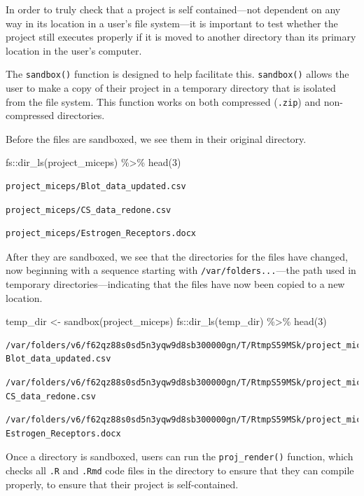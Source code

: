 \documentclass[12pt,twoside]{reedthesis}
\newenvironment{Shaded}{\begin{snugshade}}{\end{snugshade}}
\newcommand{\DecValTok}[1]{\textcolor[rgb]{0.00,0.00,0.81}{#1}}
\newcommand{\FunctionTok}[1]{\textcolor[rgb]{0.00,0.00,0.00}{#1}}
\newcommand{\NormalTok}[1]{#1}
\newcommand{\OtherTok}[1]{\textcolor[rgb]{0.56,0.35,0.01}{#1}}
\newcommand{\SpecialCharTok}[1]{\textcolor[rgb]{0.00,0.00,0.00}{#1}}
\newcommand{\StringTok}[1]{\textcolor[rgb]{0.31,0.60,0.02}{#1}}
\begin{document}
In order to truly check that a project is self contained---not dependent on any way in its location in a user's file system---it is important to test whether the project still executes properly if it is moved to another directory than its primary location in the user's computer.

The \texttt{sandbox()} function is designed to help facilitate this. \texttt{sandbox()} allows the user to make a copy of their project in a temporary directory that is isolated from the file system. This function works on both compressed (\texttt{.zip}) and non-compressed directories.

Before the files are sandboxed, we see them in their original directory.
\begin{Shaded}
\begin{Highlighting}[]
\NormalTok{fs}\SpecialCharTok{::}\FunctionTok{dir\_ls}\NormalTok{(}\StringTok{\textquotesingle{}project\_miceps\textquotesingle{}}\NormalTok{) }\SpecialCharTok{\%\textgreater{}\%}
  \FunctionTok{head}\NormalTok{(}\DecValTok{3}\NormalTok{)}
\end{Highlighting}
\end{Shaded}
\begin{verbatim}
project_miceps/Blot_data_updated.csv 
\end{verbatim}
\begin{verbatim}
project_miceps/CS_data_redone.csv 
\end{verbatim}
\begin{verbatim}
project_miceps/Estrogen_Receptors.docx
\end{verbatim}
After they are sandboxed, we see that the directories for the files have changed, now beginning with a sequence starting with \texttt{/var/folders...}---the path used in temporary directories---indicating that the files have now been copied to a new location.
\begin{Shaded}
\begin{Highlighting}[]
\NormalTok{temp\_dir }\OtherTok{\textless{}{-}} \FunctionTok{sandbox}\NormalTok{(}\StringTok{\textquotesingle{}project\_miceps\textquotesingle{}}\NormalTok{)}
\NormalTok{fs}\SpecialCharTok{::}\FunctionTok{dir\_ls}\NormalTok{(temp\_dir) }\SpecialCharTok{\%\textgreater{}\%} 
  \FunctionTok{head}\NormalTok{(}\DecValTok{3}\NormalTok{)}
\end{Highlighting}
\end{Shaded}
\begin{verbatim}
/var/folders/v6/f62qz88s0sd5n3yqw9d8sb300000gn/T/RtmpS59MSk/project_miceps/
Blot_data_updated.csv 
\end{verbatim}
\begin{verbatim}
/var/folders/v6/f62qz88s0sd5n3yqw9d8sb300000gn/T/RtmpS59MSk/project_miceps/
CS_data_redone.csv 
\end{verbatim}
\begin{verbatim}
/var/folders/v6/f62qz88s0sd5n3yqw9d8sb300000gn/T/RtmpS59MSk/project_miceps/
Estrogen_Receptors.docx
\end{verbatim}
Once a directory is sandboxed, users can run the \texttt{proj\_render()} function, which checks all \texttt{.R} and \texttt{.Rmd} code files in the directory to ensure that they can compile properly, to ensure that their project is self-contained.
\end{document}
